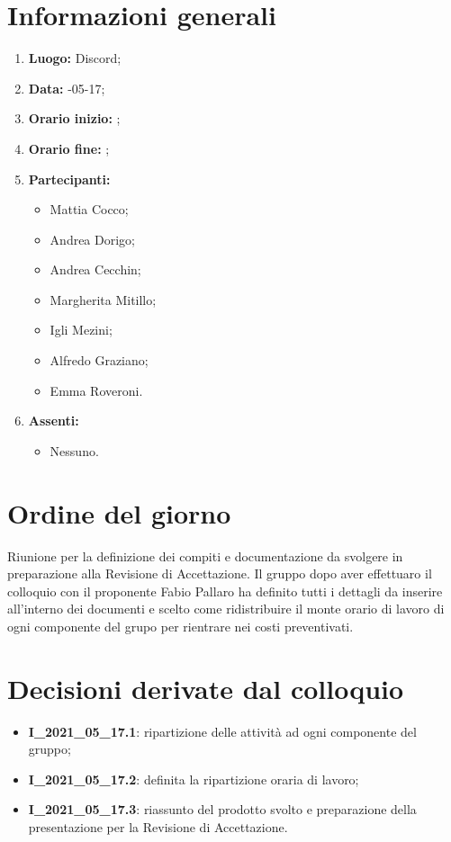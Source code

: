 \newpage
\section{Informazioni generali}
\begin{enumerate}
	\item \textbf{Luogo:} \normalfont  Discord;
	\item \textbf{Data:} -05-17;
	\item \textbf{Orario inizio:} ;
	\item \textbf{Orario fine:} ;
	\item \textbf{Partecipanti:}
	\begin{itemize}
		\item Mattia Cocco;
		\item Andrea Dorigo;
		\item Andrea Cecchin;
		\item Margherita Mitillo;
		\item Igli Mezini;
		\item Alfredo Graziano;
		\item Emma Roveroni.
	\end{itemize}
	\item \textbf{Assenti:}
	\begin{itemize}
		\item Nessuno.
	\end{itemize}
\end{enumerate}
\section{Ordine del giorno}
Riunione per la definizione dei compiti e documentazione da svolgere in preparazione alla Revisione di Accettazione. Il gruppo dopo aver effettuaro il colloquio con il proponente Fabio Pallaro ha definito tutti i dettagli da inserire all'interno dei documenti e scelto come ridistribuire il monte orario di lavoro di ogni componente del grupo per rientrare nei costi preventivati.

\section{Decisioni derivate dal colloquio}
\begin{itemize}
	\item \textbf{I\_2021\_05\_17.1}: ripartizione delle attività ad ogni componente del gruppo;
	\item \textbf{I\_2021\_05\_17.2}: definita la ripartizione oraria di lavoro;
	\item \textbf{I\_2021\_05\_17.3}: riassunto del prodotto svolto e preparazione della presentazione per la Revisione di Accettazione.
\end{itemize}